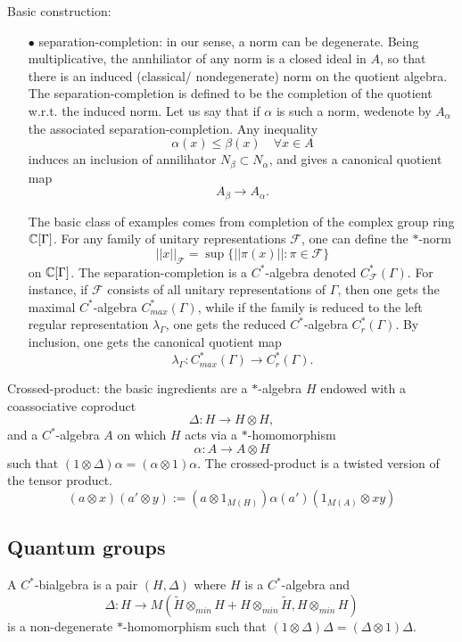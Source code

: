 Basic construction:
\begin{itemize}
\item[$\bullet$] separation-completion: in our sense, a norm can be degenerate. Being multiplicative, the annhiliator of any norm is a closed ideal in $A$, so that there is an induced (classical/ nondegenerate) norm on the quotient algebra. The separation-completion is defined to be the completion of the quotient w.r.t. the induced norm. Let us say that if $\alpha$ is such a norm, wedenote by $A_\alpha$ the associated separation-completion. Any inequality 
\[\alpha(x) \leq \beta (x) \quad \forall x\in A\]
induces an inclusion of annilihator $N_\beta \subset N_\alpha$, and gives a canonical quotient map
\[A_\beta \rightarrow A_\alpha.\]

The basic class of examples comes from completion of the complex group ring $\mathbb C[\Gamma]$. For any family of unitary representations $\mathcal F$, one can define the $*$-norm
\[||x||_{\mathcal F} = \sup \{||\pi(x)|| : \pi\in \mathcal F\}\]
on $\mathbb C[\Gamma]$. The separation-completion is a $C^*$-algebra denoted $C^*_{\mathcal F}(\Gamma)$. For instance, if $\mathcal F$ consists of all unitary representations of $\Gamma$, then one gets the maximal $C^*$-algebra $C_{max}^*(\Gamma)$, while if the family is reduced to the left regular representation $\lambda_\Gamma$, one gets the reduced $C^*$-algebra $C^*_r(\Gamma)$. By inclusion, one gets the canonical quotient map
\[\lambda_\Gamma : C^*_{max}(\Gamma) \rightarrow C_r^*(\Gamma).\]  
 
\end{itemize}

Crossed-product: the basic ingredients are a $*$-algebra $H$ endowed with a coassociative coproduct
\[\Delta : H \rightarrow H\otimes H,\]
and a $C^*$-algebra $A$ on which $H$ acts via a $*$-homomorphism
\[\alpha : A \rightarrow A\otimes H\]
such that $(1\otimes \Delta)\alpha = (\alpha \otimes 1) \alpha$. The crossed-product is a twisted version of the tensor product.  
\[(a\otimes x )(a'\otimes y ) := (a\otimes 1_{M(H)}) \alpha (a')(1_{M(A)}\otimes xy)\]
 
\subsection{Quantum groups}
 
A $C^*$-bialgebra is a pair $(H,\Delta)$ where $H$ is a $C^*$-algebra and 
\[\Delta: H \rightarrow M(\tilde H \otimes_{min} H + H\otimes_{min} \tilde H, H\otimes_{min} H)\]
is a non-degenerate $*$-homomorphism such that $(1\otimes \Delta) \Delta = (\Delta\otimes 1 ) \Delta$.\\

